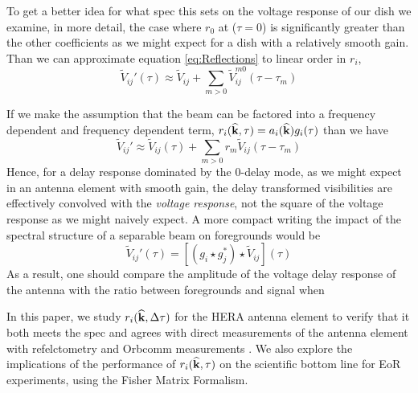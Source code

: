\documentclass[onecolumn]{emulateapj}
\begin{document}
To get a better idea for what spec this sets on the voltage response of our dish we examine, in more detail, the case where $r_0$ at ($\tau=0$) is significantly greater than the other coefficients as we might expect for a dish with a relatively smooth gain. Than we can approximate equation \ref{eq:Reflections} to linear order in $r_i$,
\begin{equation}
\widetilde{V}_{ij}'(\tau) \approx \widetilde{V}_{ij} + \sum_{m>0} \widetilde{V}_{ij}^{m0} (\tau -  \tau_m)
\end{equation}



If we make the assumption that the beam can be factored into a frequency dependent and frequency dependent term, $r_i({\bf \widehat{k}},\tau) = a_i({\bf \widehat{k}}) g_i(\tau)$ than we have
\begin{equation}
\widetilde{V}_{ij}' \approx \widetilde{V}_{ij}(\tau) + \sum_{m>0} r_m \widetilde{V}_{ij}(\tau - \tau_m)
\end{equation}
 Hence, for a delay response dominated by the $0$-delay mode, as we might expect in an antenna element with smooth gain, the delay transformed visibilities are effectively convolved with the {\it voltage response}, not the square of the voltage response as we might naively expect. A more compact writing the impact of the spectral structure of a separable beam on foregrounds would be
 \begin{equation}
 	\widetilde{V}_{ij}'(\tau) = \left[ (g_i \star g_j^*) \star \widetilde{V}_{ij}\right](\tau)
 \end{equation}
 As a result, one should compare the amplitude of the voltage delay response of the antenna with the ratio between foregrounds and signal when 


 In this paper, we study $r_i({\bf \widehat{k}},\Delta \tau)$ for the HERA antenna element to verify that it both meets the spec and agrees with direct measurements of the antenna element with refelctometry \citep{Patra:2015} and Orbcomm measurements \citep{Neben:2015b}. We also explore the implications of the performance of $r_i({\bf \widehat{k}},\tau)$ on the scientific bottom line for EoR experiments, using the Fisher Matrix Formalism. 
\end{document}

